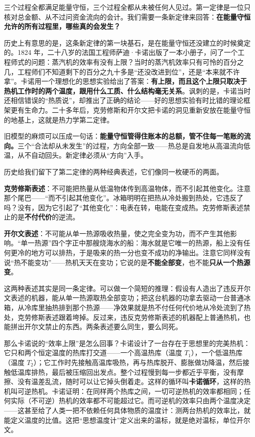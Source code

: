 三个过程全都满足能量守恒，三个过程全都从未被任何人见过。第一定律是一位只核对总金额、从不过问资金流向的会计。我们需要一条新定律来回答：\textbf{在能量守恒允许的所有过程里，哪些真的会发生？}

历史上有意思的是，这条新定律的第一块基石，是在能量守恒还没建立的时候奠定的。1824 年，二十八岁的法国工程师萨迪·卡诺出版了一本小册子，问了一个工程师式的问题：蒸汽机的效率有没有上限？当时的蒸汽机效率只有可怜的百分之几，工程师们不知道剩下的百分之九十多是“还没改进到位”，还是“本来就不许拿”。卡诺用一个理想化的思想实验给出了答案：\textbf{有上限，而且这个上限只取决于热机工作时的两个温度，跟用什么工质、什么结构毫无关系}。讽刺的是，卡诺当时还相信错误的“热质说”，却推出了正确的结论——好的思想实验有时比错的理论框架更有生命力。二十多年后，克劳修斯和开尔文把卡诺的洞见重新安放在能量守恒的地基上，这就是热力学第二定律。

\begin{mainline}
旧模型的麻烦可以压成一句话：\textbf{能量守恒管得住账本的总额，管不住每一笔账的流向。}三个“合法却从未发生”的过程，方向全部一致——热总是自发地从高温流向低温，从不自动回头。新定律必须从“方向”入手。
\end{mainline}


历史给我们留下了第二定律的两种经典表述，它们像同一枚硬币的两面。

\textbf{克劳修斯表述}：不可能把热量从低温物体传到高温物体，而不引起其他变化。注意那个尾巴——“而不引起其他变化”。冰箱明明在把热从冷处搬到热处，它违反了吗？没有，因为它引起了“其他变化”：电表在转，电能在变成热。克劳修斯表述禁止的是\textbf{不付代价}的逆流。

\textbf{开尔文表述}：不可能从单一热源吸收热量，使之完全变为功，而不产生其他影响。“单一热源”四个字正中那艘烧海水的船：海水就是它唯一的热源，船上没有任何更冷的地方可以排热，于是吸来的热一分也变不成功的净输出。注意它同样没有说“热不能变功”——热机天天在变功；它说的是\textbf{不能全部变}，也不能\textbf{只从一个热源变}。

这两种表述其实是同一条定律。可以做一个简短的推理：假设有人造出了违反开尔文表述的机器，能从单一热源取热全部变功；把这台机器的功拿去驱动一台普通冰箱，从冷库里抽热排到那个热源——净效果就是热不付任何代价地从冷处流到了热处，克劳修斯表述跟着垮掉。反过来，违反克劳修斯表述的机器配上普通热机，也能拼出开尔文禁止的东西。两条表述要么同生，要么同死。

那么卡诺说的“效率上限”是怎么回事？卡诺设计了一台存在于思想里的完美热机：它只和两个恒定温度的热库打交道——一个高温热库（温度 \(T_1\)），一个低温热库（温度 \(T_2\)）；它工作时先接触高温库吸热，再与热库脱开、膨胀做功降温，然后接触低温库排热，最后被压缩回出发点。整个过程慢到每一步都近乎平衡，没有摩擦、没有温差乱流，随时可以让它掉头倒着走。这样的循环叫\textbf{卡诺循环}，这样的热机叫可逆热机。卡诺证明：在同样两个热库之间，一切可逆热机的效率都相同；任何实际（不可逆）热机的效率都不可能超过它。而可逆机的效率只由两个温度决定——这甚至给了人类一把不依赖任何具体物质的温度计：测两台热机的效率比，就能定义温度的比值。这把“思想温度计”定义出来的温标，就是绝对温标，单位开尔文。

